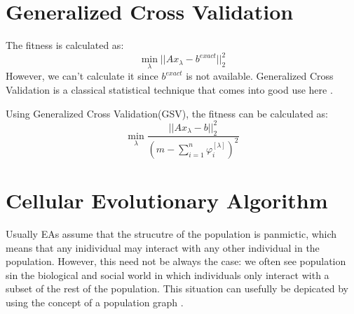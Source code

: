 \documentclass{article}
\begin{document}
\section{Generalized Cross Validation}
The fitness is calculated as:
\begin{equation}
	\mathop {\min }\limits_\lambda  ||A{x_\lambda } - {b^{exact}}||_2^2
\end{equation}
However, we can't calculate it since \(b^{exact}\) is not available. Generalized 
Cross Validation is a classical statistical technique that comes into good use
here \cite{hansen2010discrete}.

Using Generalized Cross Validation(GSV), the fitness can be calculated as:
\begin{equation}
	\mathop {\min }\limits_\lambda  \frac{{||A{x_\lambda } - b||_2^2}}{{{{(m -
	\sum\nolimits_{i = 1}^n {\varphi _i^{[\lambda ]}} )}^2}}}
	\label{eq:disintegral}
\end{equation}


\section{Cellular Evolutionary Algorithm}
Usually EAs assume that the strucutre of the population is panmictic, which
means that any inidividual may interact with any other individual in the
population.
However, this need not be always the case: we often see population sin the
biological and social world in which individuals only interact with a subset of
the rest of the population. This situation can usefully be depicated by using
the concept of a population graph \cite{hoekstra2010simulating}.

{}

\end{document}
